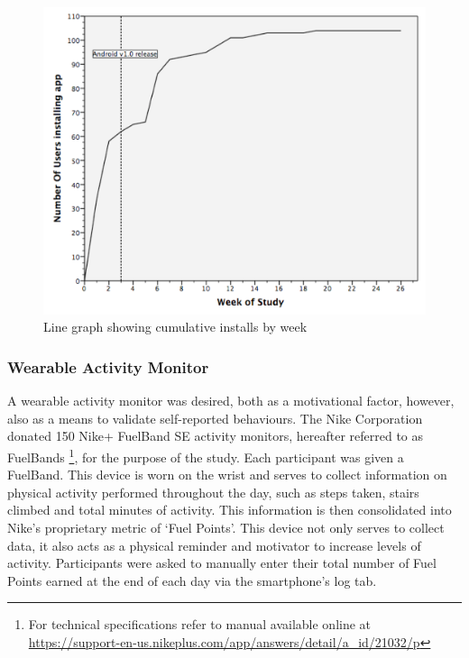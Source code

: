 \begin{figure}[h]
    \centering
    \includegraphics[scale=0.25, angle=0]{Files/prevention-study-3/figures/installs-by-week}
    \caption{Line graph showing cumulative installs by week}
    \label{fig: number-installs}
\end{figure}

\subsubsection{Wearable Activity Monitor}
A wearable activity monitor was desired, both as a motivational factor, however, also as a means to validate self-reported behaviours. The Nike Corporation donated 150 Nike+ FuelBand SE activity monitors, hereafter referred to as FuelBands \footnote{For technical specifications refer to manual available online at \url{https://support-en-us.nikeplus.com/app/answers/detail/a_id/21032/p}}, for the purpose of the study. Each participant was given a FuelBand. This device is worn on the wrist and serves to collect information on physical activity performed throughout the day, such as steps taken, stairs climbed and total minutes of activity. This information is then consolidated into Nike's proprietary metric of ‘Fuel Points’. This device not only serves to collect data, it also acts as a physical reminder and motivator to increase levels of activity. Participants were asked to manually enter their total number of Fuel Points earned at the end of each day via the smartphone’s log tab.

